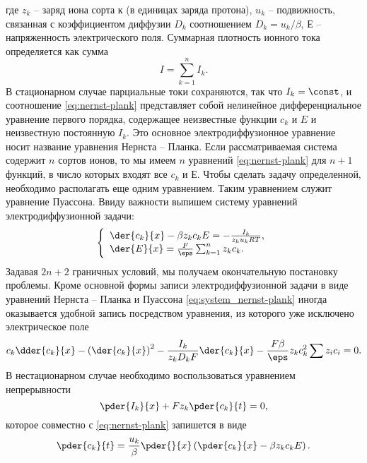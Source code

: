 где \( z_k \) -- заряд иона сорта к (в единицах заряда протона), \( u_k \) --
подвижность, связанная с коэффициентом диффузии \( D_k \) соотношением
\( D_k = u_k/\beta \), Е -- напряженность электрического поля.
Суммарная плотность ионного тока определяется как сумма
\[
    I = \sum_{k=1}^n I_k.
\]
В стационарном случае парциальные токи сохраняются, так что \( I_k = \const \),
и соотношение \eqref{eq:nernst-plank} представляет собой нелинейное
дифференциальное уравнение первого порядка, содержащее неизвестные функции
\( c_k \) и \( E \) и неизвестную постоянную \( I_k \). Это основное
электродиффузионное уравнение носит название уравнения Нернста -- Планка.
Если рассматриваемая система содержит \( n \) сортов ионов, то мы имеем \( n \)
уравнений \eqref{eq:nernst-plank} для \( n + 1 \) функций, в число которых
входят все \( c_k \) и \( Е \). Чтобы сделать задачу определенной, необходимо
располагать еще одним уравнением. Таким уравнением служит уравнение Пуассона.
Ввиду важности выпишем систему уравнений электродиффузионной задачи:
\begin{equation}
\left\{
    \begin{array}{l}
        \der{c_k}{x} - \beta z_k c_k E = - \frac{I_k}{z_k u_k RT},\\
        \der{E}{x} = \frac{F}{\eps}\sum_{k=1}^n z_k c_k.
    \end{array}
\right.
\label{eq:system_nernst-plank}
\end{equation}
Задавая \( 2n + 2 \) граничных условий, мы получаем окончательную постановку
проблемы. Кроме основной формы записи электродиффузионной задачи в виде
уравнений Нернста -- Планка и Пуассона \eqref{eq:system_nernst-plank} иногда
оказывается удобной запись посредством уравнения, из которого уже исключено
электрическое поле
\begin{equation}
    c_k\dder{c_k}{x} - \left(\der{c_k}{x}\right)^2 -
    \frac{I_k}{z_k D_k F}\der{c_k}{x} -
    \frac{F\beta}{\eps} z_k c_k^2 \sum z_i c_i = 0.
\end{equation}
В нестационарном случае необходимо воспользоваться уравнением непрерывности
\begin{equation}
    \pder{I_k}{x} + F z_k \pder{c_k}{t} = 0,
    \label{eq:continuity}
\end{equation}
которое совместно с \eqref{eq:nernst-plank} запишется в виде
\begin{equation}
    \pder{c_k}{t} =
        \frac{u_k}{\beta}\pder{}{x}\left(\pder{c_k}{x} - \beta z_k c_k E\right).
    \label{eq:nonstationery}
\end{equation}
